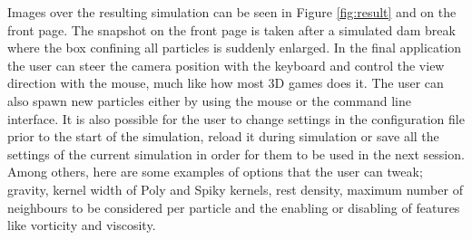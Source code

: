 Images over the resulting simulation can be seen in Figure \ref{fig:result} and
on the front page. The snapshot on the front page is taken after a simulated
dam break where the box confining all particles is suddenly enlarged.  In the
final application the user can steer the camera position with the keyboard and
control the view direction with the mouse, much like how most 3D games does it.
The user can also spawn new particles either by using the mouse or the command
line interface. It is also possible for the user to change settings in the
configuration file prior to the start of the simulation, reload it during
simulation or save all the settings of the current simulation in order for them
to be used in the next session. Among others, here are some examples of options
that the user can tweak; gravity, kernel width of Poly and Spiky kernels, rest
density, maximum number of neighbours to be considered per particle and the
enabling or disabling of features like vorticity and viscosity.

